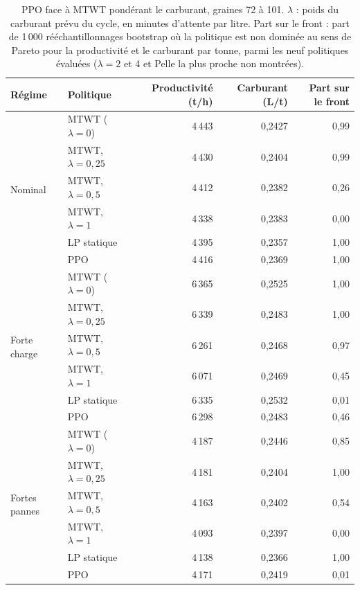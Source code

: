 \documentclass[11pt,a4paper]{article}
\newif\ifrevmarks
\newcommand{\revtag}[1]{\ifrevmarks\textsuperscript{\textcolor{red!70!black}{\scriptsize[#1]}}\fi}
\newenvironment{revbloc}[1]{\par\ifrevmarks\color{revcolor}\noindent\revtag{#1}\ \fi}{\par}
\newif\ifcorrmarks
\newcommand{\corr}[1]{\ifcorrmarks\textcolor{corrcolor}{#1}\else#1\fi}
\newenvironment{corrbloc}{\par\ifcorrmarks\color{corrcolor}\fi}{\par}
\begin{document}
\begin{revbloc}{T31}
\begin{corrbloc}
\begin{table}[H]
\centering
\caption{PPO face à MTWT pondérant le carburant, graines 72 à 101. $\lambda$ : poids du carburant prévu du cycle, en minutes d'attente par litre. Part sur le front : part de 1\,000 rééchantillonnages bootstrap où la politique est non dominée au sens de Pareto pour la productivité et le carburant par tonne, parmi les neuf politiques évaluées ($\lambda = 2$ et 4 et Pelle la plus proche non montrées).}
\label{tab:energy}
\small
\begin{tabular}{@{}llrrr@{}}
\toprule
\textbf{Régime} & \textbf{Politique} & \textbf{Productivité (t/h)} & \textbf{Carburant (L/t)} & \textbf{Part sur le front} \\
\midrule
\multirow{6}{*}{Nominal} & MTWT ($\lambda = 0$) & 4\,443 & 0{,}2427 & 0{,}99 \\
 & MTWT, $\lambda = 0{,}25$ & 4\,430 & 0{,}2404 & 0{,}99 \\
 & MTWT, $\lambda = 0{,}5$ & 4\,412 & 0{,}2382 & 0{,}26 \\
 & MTWT, $\lambda = 1$ & 4\,338 & 0{,}2383 & 0{,}00 \\
 & \corr{LP statique} & 4\,395 & 0{,}2357 & 1{,}00 \\
 & PPO & 4\,416 & 0{,}2369 & 1{,}00 \\
\midrule
\multirow{6}{*}{Forte charge} & MTWT ($\lambda = 0$) & 6\,365 & 0{,}2525 & 1{,}00 \\
 & MTWT, $\lambda = 0{,}25$ & 6\,339 & 0{,}2483 & 1{,}00 \\
 & MTWT, $\lambda = 0{,}5$ & 6\,261 & 0{,}2468 & 0{,}97 \\
 & MTWT, $\lambda = 1$ & 6\,071 & 0{,}2469 & 0{,}45 \\
 & \corr{LP statique} & 6\,335 & 0{,}2532 & 0{,}01 \\
 & PPO & 6\,298 & 0{,}2483 & 0{,}46 \\
\midrule
\multirow{6}{*}{Fortes pannes} & MTWT ($\lambda = 0$) & 4\,187 & 0{,}2446 & 0{,}85 \\
 & MTWT, $\lambda = 0{,}25$ & 4\,181 & 0{,}2404 & 1{,}00 \\
 & MTWT, $\lambda = 0{,}5$ & 4\,163 & 0{,}2402 & 0{,}54 \\
 & MTWT, $\lambda = 1$ & 4\,093 & 0{,}2397 & 0{,}00 \\
 & \corr{LP statique} & 4\,138 & 0{,}2366 & 1{,}00 \\
 & PPO & 4\,171 & 0{,}2419 & 0{,}01 \\
\bottomrule
\end{tabular}
\end{table}
\end{corrbloc}
\end{revbloc}
\end{document}

